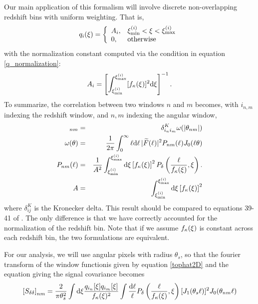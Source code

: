 Our main application of this formalism will involve discrete 
non-overlapping redshift bins with uniform weighting.  That is,
\begin{equation}
  q_i(\xi) = \left\{
  \begin{array}{ll}
    A_i, & \xi^{(i)}_{\mathrm{min}} 
    < \xi < \xi^{(i)}_{\mathrm{max}}\\
    0, & \mathrm{otherwise}
  \end{array}
  \right.
\end{equation}
with the normalization constant computed via the condition in equation 
\ref{q_normalization}:
\begin{equation}
  A_i = \left[\int_{\xi^{(i)}_{\mathrm{min}}}^{\xi^{(i)}_{\mathrm{max}}}
  [f_\kappa(\xi)]^2 \mathrm{d}\xi\right]^{-1}.
\end{equation}
To summarize, the correlation between two windows $n$ 
and $m$ becomes, with $i_{n,m}$
indexing the redshift window, and $n,m$ indexing the angular window,
\begin{eqnarray}
  [S_{\delta\delta}]_{nm} 
  &=& \delta^K_{i_ni_m}\omega(|\theta_{nm}|)\nonumber\\
  \omega(\theta)
  &=&\frac{1}{2\pi}\int_0^\infty\ell\dd\ell\, 
  |\widetilde{F}(\ell)|^2
  P_{nm}(\ell)J_0(\ell\theta)\nonumber\\
  P_{nm}(\ell) &=& 
  \frac{1}{A^2}
  \int_{\rcom^{(i)}_\mathrm{min}}^{\rcom^{(i)}_\mathrm{max}} 
  \dd\rcom \left[f_\kappa(\rcom)\right]^2
  P_\delta\left(\frac{\ell}{f_\kappa(\rcom)},\rcom\right).\nonumber\\
  A &=& \int_{\rcom^{(i)}_\mathrm{min}}^{\rcom^{(i)}_\mathrm{max}} 
  \dd\rcom \left[f_\kappa(\rcom)\right]^2
\end{eqnarray} 
where $\delta^K_{ij}$ is the Kronecker delta. This result should be 
compared  to equations 39-41 of \citet{Simon09}.  The only difference is
that we have correctly accounted for the normalization of the redshift
bin.  Note that if we assume $f_\kappa(\xi)$ is constant across
each redshift bin, the two formulations are equivalent.

For our analysis, we will use angular pixels with radius $\theta_s$, 
so that the fourier transform of the window functionis given by equation 
\ref{tophat2D} and the equation giving the signal covariance becomes
\begin{equation}
  \left[S_{\delta\delta}\right]_{nm}
  = \frac{2}{\pi\theta_s^2} 
  \int \mathrm{d}\xi \frac{q_{i_n}[\xi]q_{i_m}[\xi]}
  {f_\kappa(\xi)^2} 
  \int  \frac{\mathrm{d}\ell}{\ell}
  P_\delta\left(\frac{\ell}{f_\kappa(\xi)},\xi\right)
  [J_1(\theta_s\ell)]^2 J_0(\theta_{nm}\ell)
\end{equation}

